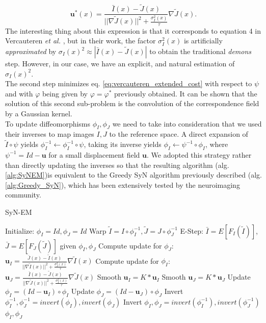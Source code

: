\begin{equation}\label{eq:euler_lagrange_step1}
    \mathbf{u}^{*}(x) = \frac{\bar{I}(x) - \tilde{J}(x)}{||\nabla \tilde{J}(x)||^{2} + \frac{\sigma_{I}^{2}(x)}{\tau}}\nabla \tilde{J}(x).
\end{equation}
The interesting thing about this expression is that it corresponds to equation 4 in Vercauteren {\it et al.} \cite{Vercauteren2009}, but in their work, the factor $\sigma_{I}^{2}(x)$
is artificially {\it approximated} by $\sigma_{I}(x)^{2} \approx |\bar{I}(x) - \tilde{J}(x)|$ to obtain the traditional {\it demons} step. However, in our case, we have an
explicit, and natural estimation of $\sigma_{I}(x)^{2}$.\\

The second step minimizes eq. \ref{eq:vercauteren_extended_cost} with respect to $\psi$ and with $\varphi$ being given by $\varphi = \varphi^{*}$ previously obtained. It can be
shown that the solution of this second sub-problem is the convolution of the correspondence field by a Gaussian kernel\cite{Vercauteren2009}.\\

To update diffeomorphisms $\phi_{I}, \phi_{J}$ we need to take into consideration that we used their inverses to map images $I, J$ to the reference space. A direct expansion of
$\tilde{I} \circ \psi$ yields $\phi_{I}^{-1} \leftarrow \phi_{I}^{-1} \circ \psi$, taking its inverse yields $\phi_{I} \leftarrow \psi^{-1} \circ \phi_{I}$, where
$\psi^{-1} = Id - \mathbf{u}$ for a small displacement field $\mathbf{u}$. We adopted this strategy rather than directly updating the inverses so that the resulting algorithm
(alg. \ref{alg:SyNEM})is equivalent to the Greedy SyN algorithm previously described (alg. \ref{alg:Greedy_SyN}), which has been extensively tested by the neuroimaging
community.

\begin{algorithm}[h!]
\caption{SyN-EM}\label{alg:SyNEM}
\begin{algorithmic}[1]
\STATE Initialize: $\phi_{I} = Id, \phi_{J} = Id$
\REPEAT
    \STATE Warp $\tilde{I}  = I \circ \phi_{I}^{-1}, \tilde{J} = J \circ \phi_{J}^{-1}$
    \STATE E-Step: $\bar{I} = E[F_{I}(\tilde{I})]$, $\bar{J} = E[F_{J}(\tilde{J})]$ given $\phi_{I}, \phi_{J}$
    \STATE Compute update for $\phi_{J}$: $\mathbf{u}_{I} = \frac{\bar{J}(x) - \tilde{I}(x)}{||\nabla \tilde{I}(x)||^{2} + \frac{\sigma_{J}^{2}(x)}{\tau}}\nabla \tilde{I}(x)$
    \STATE Compute update for $\phi_{I}$: $\mathbf{u}_{J} = \frac{\bar{I}(x) - \tilde{J}(x)}{||\nabla \tilde{J}(x)||^{2} + \frac{\sigma_{I}^{2}(x)}{\tau}}\nabla \tilde{J}(x)$
    \STATE Smooth $\mathbf{u}_{I} = K \ast \mathbf{u}_{I}$
    \STATE Smooth $\mathbf{u}_{J} = K \ast \mathbf{u}_{J}$
    \STATE Update $\phi_{I} = (Id - \mathbf{u}_{I}) \circ \phi_{I}$
    \STATE Update $\phi_{J} = (Id - \mathbf{u}_{J}) \circ \phi_{J}$
    \STATE Invert $\phi_{I}^{-1}, \phi_{J}^{-1} = invert(\phi_{I}), invert(\phi_{J})$
    \STATE Invert $\phi_{I}, \phi_{J} = invert(\phi_{I}^{-1}), invert(\phi_{J}^{-1})$
\RETURN $\phi_{I}, \phi_{J}$
\end{algorithmic}
\end{algorithm}


